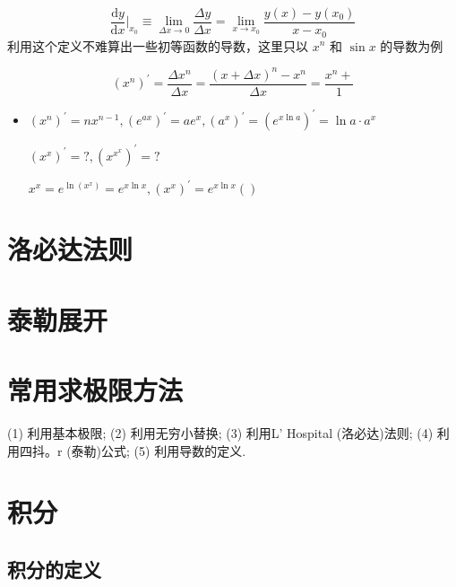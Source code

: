 \documentclass[lang=cn,newtx,10pt,scheme=chinese]{elegantbook}
\begin{document}
\begin{equation}
  \frac{\mathrm{d}y}{\mathrm{d}x} \big|_{x_0}\equiv \lim_{\Delta x \to 0} \frac{\Delta y}{\Delta x}=\lim_{x \to x_0} \frac{y(x)-y(x_0)}{x-x_0}
\end{equation}
利用这个定义不难算出一些初等函数的导数，这里只以 $x^{n}$ 和 $\sin x$ 的导数为例
\begin{example}
  \begin{equation}
    (x^{n})^{\prime }=\frac{\Delta x^{n}}{\Delta x}=\frac{(x+\Delta x)^{n}-x^{n}}{\Delta x}=\frac{x^{n}+}{1}
  \end{equation}
\end{example}
\begin{itemize}
  \item $(x^{n})^{\prime }=n x^{n-1},(e^{ax})^{\prime }=ae^{x},(a^{x})^{\prime }=(e^{x\ln a})^{\prime }=\ln a \cdot  a^{x}$
  \begin{problem}
    $(x^{x})^{\prime }=?,(x^{x^{x}})^{\prime }=?$
  \end{problem}
  \begin{solution}
    $x^{x}=e^{\ln(x^{x})}=e^{x\ln x},(x^{x})^{\prime }=e^{x \ln x}()$
  \end{solution}
\end{itemize}
\section{洛必达法则}
\section{泰勒展开}
\section{常用求极限方法}
(1) 利用基本极限;
(2) 利用无穷小替换;
(3) 利用L' Hospital (洛必达)法则;
(4) 利用四抖。r (泰勒)公式;
(5) 利用导数的定义.
	\section{积分}
    \subsection{积分的定义}
\end{document}
